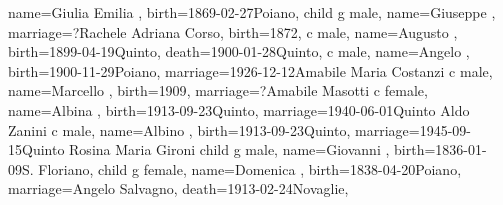 \documentclass{article}
\begin{document}
\begin{midpage}
\begin{center}
\begin{genealogypicture}
{{{{{{                        name={Giulia Emilia },
                        birth={1869-02-27}{Poiano},
                    }
                }
                child{
                    g{
                        male,
                        name={Giuseppe },
                        marriage={?}{Rachele Adriana Corso},
                        birth={1872}{},
                    }
                    c{
                        male,
                        name={Augusto },
                        birth={1899-04-19}{Quinto},
                        death={1900-01-28}{Quinto},
                    }
                    c{
                        male,
                        name={Angelo },
                        birth={1900-11-29}{Poiano},
                        marriage={1926-12-12}{Amabile Maria Costanzi}
                    }
                    c{
                        male,
                        name={Marcello },
                        birth={1909}{},
                        marriage={?}{Amabile Masotti}
                    }
                    c{
                        female,
                        name={Albina },
                        birth={1913-09-23}{Quinto},
                        marriage={1940-06-01}{Quinto \newline Aldo Zanini}
                    }
                    c{
                        male,
                        name={Albino },
                        birth={1913-09-23}{Quinto},
                        marriage={1945-09-15}{Quinto \newline Rosina Maria Gironi}
                    }
                }
            }
            child{
                g{
                    male,
                    name={Giovanni },
                    birth={1836-01-09}{S. Floriano},
                }
            }
            child{
                g{
                    female,
                    name={Domenica },
                    birth={1838-04-20}{Poiano},
                    marriage={Angelo Salvagno}{},
                    death={1913-02-24}{Novaglie},
                }
            }
        }
    }
}
\end{genealogypicture}

\end{center}
\end{midpage}
\end{document}
